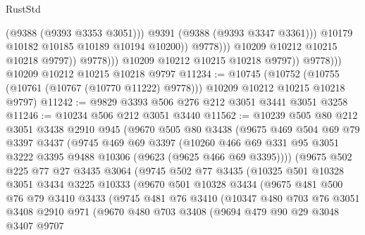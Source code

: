 \begin{lexlean}{RustStd}
\begin{coremodule}
                                      (@9388 (@9393 @3353 @3051)))
                                    @9391
                                    (@9388 (@9393 @3347 @3361)))
                                  @10179
                                  @10182
                                  @10185
                                  @10189
                                  @10194
                                  @10200))
                              @9778)))
                        @10209
                        @10212
                        @10215
                        @10218
                        @9797))
                    @9778)))
              @10209
              @10212
              @10215
              @10218
              @9797))
          @9778)))
    @10209
    @10212
    @10215
    @10218
    @9797
@11234 := @10745
    (@10752 (@10755 (@10761 (@10767 (@10770 @11222) @9778))) @10209 @10212 @10215 @10218 @9797)
@11242 := @9829 @3393 @506 @276 @212 @3051 @3441 @3051 @3258
@11246 := @10234 @506 @212 @3051 @3440
@11562 := @10239
    @505
    @80
    @212
    @3051
    @3438
    @2910
    @945
    (@9670
      @505
      @80
      @3438
      (@9675
        @469
        @504
        @69
        @79
        @3397
        @3437
        (@9745
          @469
          @69
          @3397
          (@10260 @466 @69 @331 @95 @3051 @3222 @3395 @9488 @10306 (@9623 (@9625 @466 @69 @3395))))
        (@9675
          @502
          @225
          @77
          @27
          @3435
          @3064
          (@9745
            @502
            @77
            @3435
            (@10325
              @501
              @10328
              @3051
              @3434
              @3225
              @10333
              (@9670
                @501
                @10328
                @3434
                (@9675
                  @481
                  @500
                  @76
                  @79
                  @3410
                  @3433
                  (@9745
                    @481
                    @76
                    @3410
                    (@10347
                      @480
                      @703
                      @76
                      @3051
                      @3408
                      @2910
                      @971
                      (@9670
                        @480
                        @703
                        @3408
                        (@9694
                          @479
                          @90
                          @29
                          @3048
                          @3407
                          @9707

\end{coremodule}
\end{lexlean}
